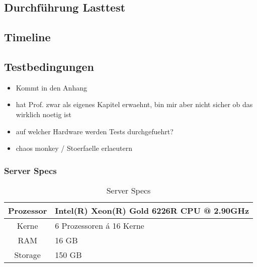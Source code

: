 \subsection{Durchf\"uhrung Lasttest}
\subsection{Timeline}

\subsection{Testbedingungen}
\begin{itemize}
  \item Kommt in den Anhang
  \item hat Prof. zwar als eigenes Kapitel erwaehnt, bin mir aber nicht sicher ob das wirklich noetig ist
  \item auf welcher Hardware werden Tests durchgefuehrt?
  \item chaos monkey / Stoerfaelle erlaeutern
\end{itemize}


\subsubsection{Server Specs}

\begin{table}
  \centering
  \caption{Server Specs}
  \bigskip
  \begin{tabular}{ c l }
    \toprule
    Prozessor & Intel(R) Xeon(R) Gold 6226R CPU @ 2.90GHz \\
    \midrule
    Kerne & 6 Prozessoren á 16 Kerne \\
    \midrule
    RAM & 16 GB \\
    \midrule
    Storage & 150 GB \\
    \bottomrule
  \end{tabular}
\end{table}
